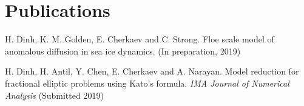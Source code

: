 \newcommand{\arxiv}[1]{[\href{http://arxiv.org/abs/#1}{arXiv:#1}]}


\setcounter{numPubs}{1}
\setcounter{pubCounter}{\value{numPubs}}


\section{\sc Publications}
\begin{etaremune}[start=\value{pubCounter}]
   \item[  ] 
  H. Dinh, K. M. Golden, E. Cherkaev and C. Strong. Floe scale model of anomalous diffusion in sea ice dynamics. (In preparation, 2019)
  \item[  ]
  H. Dinh, H. Antil, Y. Chen, E. Cherkaev and A. Narayan. Model reduction for fractional elliptic problems using Kato's formula. {\it IMA Journal of Numerical Analysis} (Submitted 2019)

 \end{etaremune}



